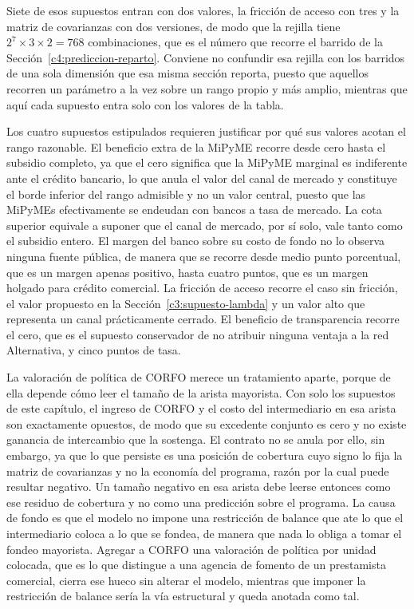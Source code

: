 Siete de esos supuestos entran con dos valores, la fricción de acceso con tres y la matriz de covarianzas con dos versiones, de modo que la rejilla tiene $2^{7}\times 3\times 2 = 768$ combinaciones, que es el número que recorre el barrido de la Sección~\ref{c4:prediccion-reparto}. Conviene no confundir esa rejilla con los barridos de una sola dimensión que esa misma sección reporta, puesto que aquellos recorren un parámetro a la vez sobre un rango propio y más amplio, mientras que aquí cada supuesto entra solo con los valores de la tabla.

Los cuatro supuestos estipulados requieren justificar por qué sus valores acotan el rango razonable. El beneficio extra de la MiPyME recorre desde cero hasta el subsidio completo, ya que el cero significa que la MiPyME marginal es indiferente ante el crédito bancario, lo que anula el valor del canal de mercado y constituye el borde inferior del rango admisible y no un valor central, puesto que las MiPyMEs efectivamente se endeudan con bancos a tasa de mercado. La cota superior equivale a suponer que el canal de mercado, por sí solo, vale tanto como el subsidio entero. El margen del banco sobre su costo de fondo no lo observa ninguna fuente pública, de manera que se recorre desde medio punto porcentual, que es un margen apenas positivo, hasta cuatro puntos, que es un margen holgado para crédito comercial. La fricción de acceso recorre el caso sin fricción, el valor propuesto en la Sección~\ref{c3:supuesto-lambda} y un valor alto que representa un canal prácticamente cerrado. El beneficio de transparencia recorre el cero, que es el supuesto conservador de no atribuir ninguna ventaja a la red Alternativa, y cinco puntos de tasa.

La valoración de política de CORFO merece un tratamiento aparte, porque de ella depende cómo leer el tamaño de la arista mayorista. Con solo los supuestos de este capítulo, el ingreso de CORFO y el costo del intermediario en esa arista son exactamente opuestos, de modo que su excedente conjunto es cero y no existe ganancia de intercambio que la sostenga. El contrato no se anula por ello, sin embargo, ya que lo que persiste es una posición de cobertura cuyo signo lo fija la matriz de covarianzas y no la economía del programa, razón por la cual puede resultar negativo. Un tamaño negativo en esa arista debe leerse entonces como ese residuo de cobertura y no como una predicción sobre el programa. La causa de fondo es que el modelo no impone una restricción de balance que ate lo que el intermediario coloca a lo que se fondea, de manera que nada lo obliga a tomar el fondeo mayorista. Agregar a CORFO una valoración de política por unidad colocada, que es lo que distingue a una agencia de fomento de un prestamista comercial, cierra ese hueco sin alterar el modelo, mientras que imponer la restricción de balance sería la vía estructural y queda anotada como tal.

